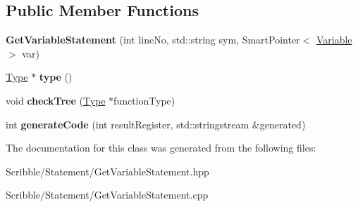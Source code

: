 \subsection*{Public Member Functions}
\begin{DoxyCompactItemize}
\item 
\hypertarget{class_get_variable_statement_ad66af65f15fe708077b54d11e55e84ad}{{\bfseries Get\-Variable\-Statement} (int line\-No, std\-::string sym, Smart\-Pointer$<$ \hyperlink{class_variable}{Variable} $>$ var)}\label{class_get_variable_statement_ad66af65f15fe708077b54d11e55e84ad}

\item 
\hypertarget{class_get_variable_statement_ac830b142ef0e87ce0f0a43f6413e3d31}{\hyperlink{class_type}{Type} $\ast$ {\bfseries type} ()}\label{class_get_variable_statement_ac830b142ef0e87ce0f0a43f6413e3d31}

\item 
\hypertarget{class_get_variable_statement_a60f96adc189df5bf900490aea3608ed7}{void {\bfseries check\-Tree} (\hyperlink{class_type}{Type} $\ast$function\-Type)}\label{class_get_variable_statement_a60f96adc189df5bf900490aea3608ed7}

\item 
\hypertarget{class_get_variable_statement_abd4b3ab40104b06017b9418970726fbf}{int {\bfseries generate\-Code} (int result\-Register, std\-::stringstream \&generated)}\label{class_get_variable_statement_abd4b3ab40104b06017b9418970726fbf}

\end{DoxyCompactItemize}


The documentation for this class was generated from the following files\-:\begin{DoxyCompactItemize}
\item 
Scribble/\-Statement/Get\-Variable\-Statement.\-hpp\item 
Scribble/\-Statement/Get\-Variable\-Statement.\-cpp\end{DoxyCompactItemize}
